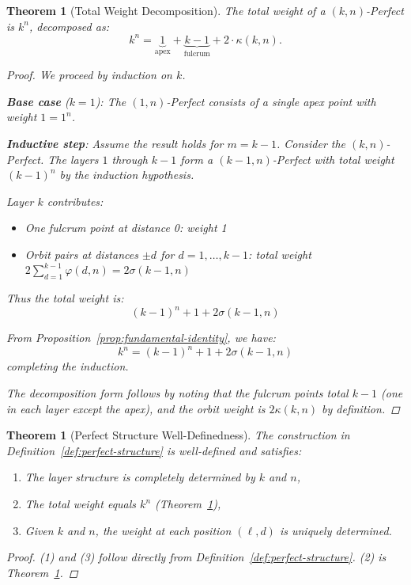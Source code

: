 \documentclass[11pt]{article}
\newtheorem{theorem}[definition]{Theorem}
\begin{document}
\begin{theorem}[Total Weight Decomposition]\label{thm:weight-decomposition}
The total weight of a $(k,n)$-Perfect is $k^{n}$, decomposed as:
\[
k^{n} = \underbrace{1}_{\text{apex}} + \underbrace{k-1}_{\text{fulcrum}} + 2 \cdot \kappa(k,n).
\]
\begin{proof}
We proceed by induction on $k$.

\textbf{Base case} ($k=1$): The $(1,n)$-Perfect consists of a single apex point with weight $1 = 1^n$.

\textbf{Inductive step}: Assume the result holds for $m = k-1$. Consider the $(k,n)$-Perfect. The layers $1$ through $k-1$ form a $(k-1,n)$-Perfect with total weight $(k-1)^n$ by the induction hypothesis.

Layer $k$ contributes:
\begin{itemize}
    \item One fulcrum point at distance 0: weight 1
    \item Orbit pairs at distances $\pm d$ for $d=1,\ldots,k-1$: total weight $2\sum_{d=1}^{k-1} \varphi(d,n) = 2\sigma(k-1,n)$
\end{itemize}

Thus the total weight is:
\[
(k-1)^n + 1 + 2\sigma(k-1,n)
\]

From Proposition~\ref{prop:fundamental-identity}, we have:
\[
k^n = (k-1)^n + 1 + 2\sigma(k-1,n)
\]
completing the induction.

The decomposition form follows by noting that the fulcrum points total $k-1$ (one in each layer except the apex), and the orbit weight is $2\kappa(k,n)$ by definition.
\end{proof}
\end{theorem}

\begin{theorem}[Perfect Structure Well-Definedness]\label{thm:uniqueness}
The construction in Definition~\ref{def:perfect-structure} is well-defined and satisfies:
\begin{enumerate}
    \item The layer structure is completely determined by $k$ and $n$,
    \item The total weight equals $k^n$ (Theorem~\ref{thm:weight-decomposition}),
    \item Given $k$ and $n$, the weight at each position $(\ell,d)$ is uniquely determined.
\end{enumerate}
\begin{proof}
(1) and (3) follow directly from Definition~\ref{def:perfect-structure}. (2) is Theorem~\ref{thm:weight-decomposition}.
\end{proof}
\end{theorem}
\end{document}
